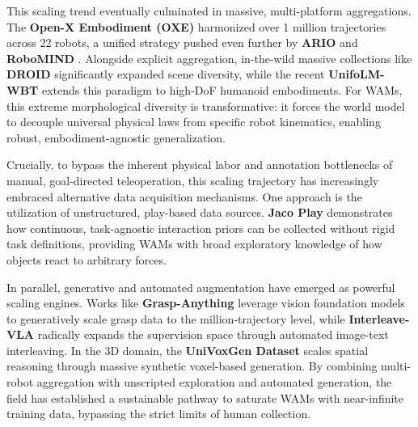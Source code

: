 This scaling trend eventually culminated in massive, multi-platform aggregations. The \textbf{Open-X Embodiment (OXE)} \cite{OXE} harmonized over 1 million trajectories across 22 robots, a unified strategy pushed even further by \textbf{ARIO} \cite{ARIO} and \textbf{RoboMIND} \cite{RoboMIND}. Alongside explicit aggregation, in-the-wild massive collections like \textbf{DROID} \cite{DROID} significantly expanded scene diversity, while the recent \textbf{UnifoLM-WBT} \cite{UnifoLM-WBT} extends this paradigm to high-DoF humanoid embodiments. For WAMs, this extreme morphological diversity is transformative: it forces the world model to decouple universal physical laws from specific robot kinematics, enabling robust, embodiment-agnostic generalization.

Crucially, to bypass the inherent physical labor and annotation bottlenecks of manual, goal-directed teleoperation, this scaling trajectory has increasingly embraced alternative data acquisition mechanisms. One approach is the utilization of unstructured, play-based data sources. \textbf{Jaco Play} \cite{Jaco-Play} demonstrates how continuous, task-agnostic interaction priors can be collected without rigid task definitions, providing WAMs with broad exploratory knowledge of how objects react to arbitrary forces. 

In parallel, generative and automated augmentation have emerged as powerful scaling engines. Works like \textbf{Grasp-Anything} \cite{Grasp-Anything} leverage vision foundation models to generatively scale grasp data to the million-trajectory level, while \textbf{Interleave-VLA} \cite{Interleave-VLA} radically expands the supervision space through automated image-text interleaving. In the 3D domain, the \textbf{UniVoxGen Dataset} \cite{UniVoxGen-Dataset} scales spatial reasoning through massive synthetic voxel-based generation. By combining multi-robot aggregation with unscripted exploration and automated generation, the field has established a sustainable pathway to saturate WAMs with near-infinite training data, bypassing the strict limits of human collection.

